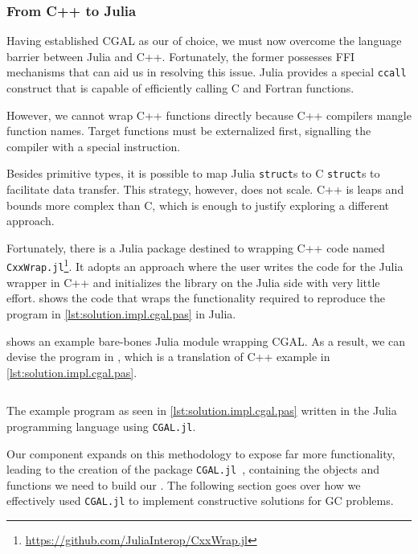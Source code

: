 \subsubsection{From C++ to Julia}%
\label{sec:solution.impl.jlcgal}

Having established \ac{CGAL} as our \geomlibrary{} of choice, we must now
overcome the language barrier between Julia and C++.  Fortunately, the former
possesses \ac{FFI} mechanisms that can aid us in resolving this issue.  Julia
provides a special \texttt{ccall} construct that is capable of
efficiently calling C and Fortran functions.

However, we cannot wrap C++ functions directly because C++ compilers mangle
function names.  Target functions must be externalized first, signalling the
compiler with a special instruction.

Besides primitive types, it is possible to map Julia \texttt{struct}s
to C \texttt{struct}s to facilitate data transfer.  This strategy,
however, does not scale.  C++ is leaps and bounds more complex than C, which is
enough to justify exploring a different approach.

Fortunately, there is a Julia package destined to wrapping C++ code named
\texttt{CxxWrap.jl}\footnote{\url{https://github.com/JuliaInterop/CxxWrap.jl}}.
It adopts an approach where the user writes the code for the Julia wrapper in
C++ and initializes the library on the Julia side with very little effort.
 shows the code that wraps the
functionality required to reproduce the program in
\cref{lst:solution.impl.cgal.pas} in Julia.

 shows an example bare-bones Julia module
wrapping \ac{CGAL}.  As a result, we can devise the program in
, which is a translation of C++ example in
\cref{lst:solution.impl.cgal.pas}.

\begin{listing}[htbp]
  \inputminted{julia}{jl/points_and_segments.jl}
  \caption{\label{lst:solution.impl.jlcgal.pas}
    The example program as seen in \cref{lst:solution.impl.cgal.pas} written in
    the Julia programming language using \texttt{CGAL.jl}.}%
\end{listing}

Our \wrapper{} component expands on this methodology to expose far more
functionality, leading to the creation of the package
\texttt{CGAL.jl}~\cite{Ventura:2021:CGAL.jl},  containing the objects and
functions we need to build our \primitives{}.  The following section goes over
how we effectively used \texttt{CGAL.jl} to implement constructive solutions for
\ac{GC} problems.
